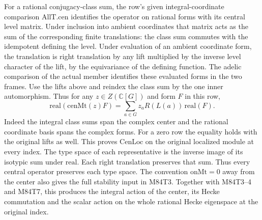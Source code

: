 For a rational conjugacy-class sum, the row's given integral-coordinate
comparison $\mathrm{AllT.cen}$ identifies the operator on rational
forms with its central level matrix. Under inclusion into ambient
coordinates that matrix acts as the sum of the corresponding finite
translations: the class sum commutes with the idempotent defining
the level. Under evaluation of an ambient coordinate form, the
translation is right translation by any lift multiplied by the inverse
level character of the lift, by the equivariance of the defining
function. The adelic comparison of the actual member identifies
these evaluated forms in the two frames. Use the lifts above and
reindex the class sum by the one inner automorphism. Thus for any
$z\in Z(\mathbb C[G])$ and form $F$ in this row,
\[
 \mathrm{real}(\mathrm{cenMt}(z)F)=
 \sum_{a\in G}z_a R(L(a))\,\mathrm{real}(F).
\]
Indeed the integral class sums span the complex center and the
rational coordinate basis spans the complex forms. For a zero row
the equality holds with the original lifts as well. This proves
$\mathrm{CenLoc}$ on the original localized module at every index.
The type space of each representative is the inverse image of its
isotypic sum under $\mathrm{real}$. Each right translation
preserves that sum. Thus every central operator preserves each type
space. The convention $\mathrm{onMt}=0$ away from the center
also gives the full stability input in M84T3. Together with
M84T3--4 and M84T7, this produces the integral action of the
center, its Hecke commutation and the scalar action on the whole
rational Hecke eigenspace at the original index.

